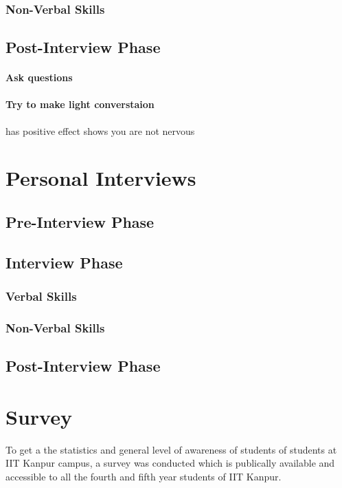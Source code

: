\documentclass[a4paper,12pt]{report}
\begin{document}
\subsection{Non-Verbal Skills}
\section{Post-Interview Phase}
\subsubsection{Ask questions}
\subsubsection{Try to make light converstaion}
has positive effect shows you are not nervous
\chapter{Personal Interviews}
\section{Pre-Interview Phase}
\section{Interview Phase}
\subsection{Verbal Skills}
\subsection{Non-Verbal Skills}
\section{Post-Interview Phase}
\chapter{Survey}
To get a the statistics and general level of awareness of students of students at IIT Kanpur campus, a
survey was conducted which is publically available and accessible to all the fourth and fifth year 
students of IIT Kanpur.
\end{document}
